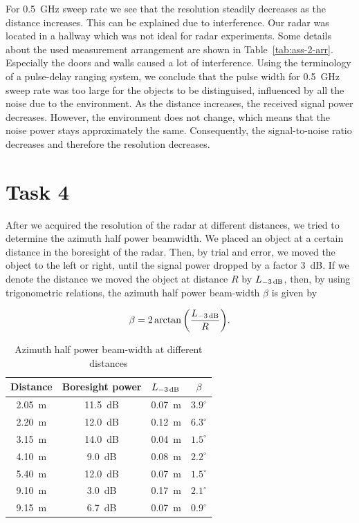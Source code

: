 \documentclass[11pt,titlepage]{report}
\begin{document}
For \SI{0.5}{GHz} sweep rate we see that the resolution steadily decreases as the distance increases. This can be explained due to interference. Our radar was located in a hallway which was not ideal for radar experiments. Some details about the used measurement arrangement are shown in Table~\ref{tab:ass-2-arr}. Especially the doors and walls caused a lot of interference. Using the terminology of a pulse-delay ranging system, we conclude that the pulse width for \SI{0.5}{GHz} sweep rate was too large for the objects to be distinguised, influenced by all the noise due to the environment. As the distance increases, the received signal power decreases. However, the environment does not change, which means that the noise power stays approximately the same. Consequently, the signal-to-noise ratio decreases and therefore the resolution decreases.

\section{Task 4}
After we acquired the resolution of the radar at different distances, we tried to determine the azimuth half power beamwidth. We placed an object at a certain distance in the boresight of the radar. Then, by trial and error, we moved the object to the left or right, until the signal power dropped by a factor \SI{3}{dB}. If we denote the distance we moved the object at distance $R$ by $L_{\text{\SI{-3}{dB}}}$, then, by using trigonometric relations, the azimuth half power beam-width $\beta$ is given by

\begin{equation}
	\beta = 2 \arctan{\left(\frac{L_{\text{\SI{-3}{dB}}}}{R}\right)}.
\end{equation}

\newcommand{\ignore}[1]{}

\begin{table}[H]
	\centering
	\caption{Azimuth half power beam-width at different distances}
	\label{tab:ass-2-az}
	\begin{tabular}{c c c c}
		\hline\hline
		Distance & Boresight power & $L_{\text{\SI{-3}{dB}}}$ & $\beta$ \\
		\hline
		\SI{2.05}{m} & \SI{11.5}{dB} & \SI{0.07}{m} & $3.9^\circ$ \\
		\SI{2.20}{m} & \SI{12.0}{dB} & \SI{0.12}{m} & $6.3^\circ$ \\
		\SI{3.15}{m} & \SI{14.0}{dB} & \SI{0.04}{m} & $1.5^\circ$ \\
		\SI{4.10}{m} & \SI{9.0}{dB} & \SI{0.08}{m} & $2.2^\circ$ \\
		\SI{5.40}{m} & \SI{12.0}{dB} & \SI{0.07}{m} & $1.5^\circ$ \\
		\SI{9.10}{m} & \SI{3.0}{dB} & \SI{0.17}{m} & $2.1^\circ$ \\
		\SI{9.15}{m} & \SI{6.7}{dB} & \SI{0.07}{m} & $0.9^\circ$ \\
		\hline
	\end{tabular}
\end{table}
\end{document}
